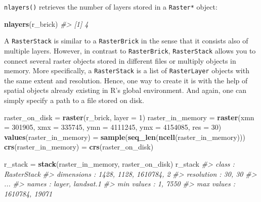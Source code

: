 \documentclass[]{krantz}
\newenvironment{Shaded}{\begin{snugshade}}{\end{snugshade}}
\newcommand{\CommentTok}[1]{\textcolor[rgb]{0.37,0.37,0.37}{\textit{#1}}}
\newcommand{\DataTypeTok}[1]{\textcolor[rgb]{0.27,0.27,0.27}{#1}}
\newcommand{\DecValTok}[1]{\textcolor[rgb]{0.06,0.06,0.06}{#1}}
\newcommand{\KeywordTok}[1]{\textcolor[rgb]{0.27,0.27,0.27}{\textbf{#1}}}
\newcommand{\NormalTok}[1]{#1}
\newcommand{\StringTok}[1]{\textcolor[rgb]{0.5,0.5,0.5}{#1}}
\begin{document}
\texttt{nlayers()} retrieves the number of layers stored in a \texttt{Raster*} object:

\begin{Shaded}
\begin{Highlighting}[]
\KeywordTok{nlayers}\NormalTok{(r_brick)}
\CommentTok{#> [1] 4}
\end{Highlighting}
\end{Shaded}

A \texttt{RasterStack} is similar to a \texttt{RasterBrick} in the sense that it consists also of multiple layers.
However, in contrast to \texttt{RasterBrick}, \texttt{RasterStack} allows you to connect several raster objects stored in different files or multiply objects in memory.
More specifically, a \texttt{RasterStack} is a list of \texttt{RasterLayer} objects with the same extent and resolution.
Hence, one way to create it is with the help of spatial objects already existing in R's global environment.
And again, one can simply specify a path to a file stored on disk.

\begin{Shaded}
\begin{Highlighting}[]
\NormalTok{raster_on_disk =}\StringTok{ }\KeywordTok{raster}\NormalTok{(r_brick, }\DataTypeTok{layer =} \DecValTok{1}\NormalTok{)}
\NormalTok{raster_in_memory =}\StringTok{ }\KeywordTok{raster}\NormalTok{(}\DataTypeTok{xmn =} \DecValTok{301905}\NormalTok{, }\DataTypeTok{xmx =} \DecValTok{335745}\NormalTok{,}
                          \DataTypeTok{ymn =} \DecValTok{4111245}\NormalTok{, }\DataTypeTok{ymx =} \DecValTok{4154085}\NormalTok{, }
                          \DataTypeTok{res =} \DecValTok{30}\NormalTok{)}
\KeywordTok{values}\NormalTok{(raster_in_memory) =}\StringTok{ }\KeywordTok{sample}\NormalTok{(}\KeywordTok{seq_len}\NormalTok{(}\KeywordTok{ncell}\NormalTok{(raster_in_memory)))}
\KeywordTok{crs}\NormalTok{(raster_in_memory) =}\StringTok{ }\KeywordTok{crs}\NormalTok{(raster_on_disk)}
\end{Highlighting}
\end{Shaded}

\begin{Shaded}
\begin{Highlighting}[]
\NormalTok{r_stack =}\StringTok{ }\KeywordTok{stack}\NormalTok{(raster_in_memory, raster_on_disk)}
\NormalTok{r_stack}
\CommentTok{#> class : RasterStack}
\CommentTok{#> dimensions : 1428, 1128, 1610784, 2}
\CommentTok{#> resolution : 30, 30}
\CommentTok{#> ...}
\CommentTok{#> names       :   layer, landsat.1 }
\CommentTok{#> min values  :       1,      7550 }
\CommentTok{#> max values  : 1610784,     19071}
\end{Highlighting}
\end{Shaded}
\end{document}
